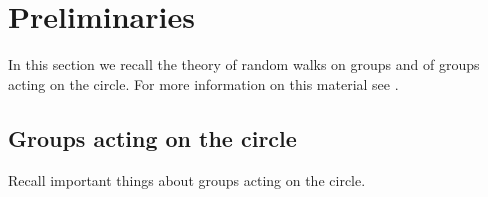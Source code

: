 \section{Preliminaries} In this section we recall the theory of random walks on groups and of groups acting on the circle. For more information on this material see \cite{Lalley2023, Ghys2001}.


\subsection{Groups acting on the circle}
Recall important things about groups acting on the circle.


